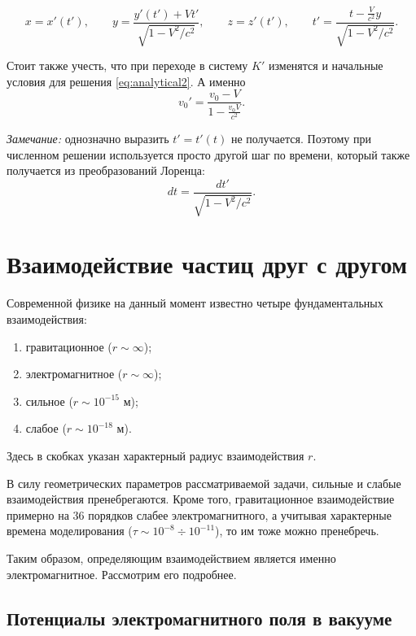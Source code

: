 \begin{equation}
x = x'(t'), \qquad y = \frac{y'(t') + Vt'}{\sqrt{1 - V^2/c^2}}, \qquad z = z'(t'), \qquad t' = \frac{t - \frac{V}{c^2}y}{\sqrt{1 - V^2/c^2}}.
\label{eq:fsdfdsf}
\end{equation}

Стоит также учесть, что при переходе в систему $K'$ изменятся и начальные условия для решения \eqref{eq:analytical2}. А именно
\begin{equation}
v_0' = \frac{v_0 - V}{1 - \frac{v_0 V}{c^2}}.
\end{equation}

\textit{Замечание:} однозначно выразить $t' = t'(t)$ не получается. Поэтому при численном решении используется просто другой шаг по времени, который также получается из преобразований Лоренца:
\begin{equation}
dt = \frac{dt'}{\sqrt{1 - V^2/c^2}}.
\end{equation}



\section{Взаимодействие частиц друг с другом}

Современной физике на данный момент известно \cite{ivanov2012} четыре фундаментальных взаимодействия:
\begin{enumerate}
\item гравитационное ($r \sim \infty$);
\item электромагнитное ($r \sim \infty$);
\item сильное ($r \sim 10^{-15}$ м);
\item слабое ($r \sim 10^{-18}$ м).
\end{enumerate}
Здесь в скобках указан характерный радиус взаимодействия $r$. 

В силу геометрических параметров рассматриваемой задачи, сильные и слабые взаимодействия пренебрегаются. Кроме того, гравитационное взаимодействие примерно на 36 порядков слабее электромагнитного, а учитывая характерные времена моделирования ($\tau \sim 10^{-8}\div10^{-11}$), то им тоже можно пренебречь.

Таким образом, определяющим взаимодействием является именно электромагнитное. Рассмотрим его подробнее.

\subsection{Потенциалы электромагнитного поля в вакууме}

